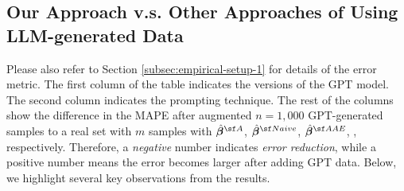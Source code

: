 \subsection{Our Approach v.s. Other Approaches of Using LLM-generated Data}

Please also refer to Section \ref{subsec:empirical-setup-1} for details of the error metric.
The first column of the table indicates the versions of the GPT model. The second column indicates the prompting technique. The rest of the columns show the difference in the MAPE after augmented $n=1,000$ GPT-generated samples to a real set with $m$ samples with $\hat{\betavec}^{\sf A}$, $\hat{\betavec}^{\sf Naive}$, $\hat{\betavec}^{\sf AAE}$, , respectively. Therefore, a \textit{negative} number indicates \textit{error reduction}, while a positive number means the error becomes larger after adding GPT data. 
Below, we highlight several key observations from the results.


